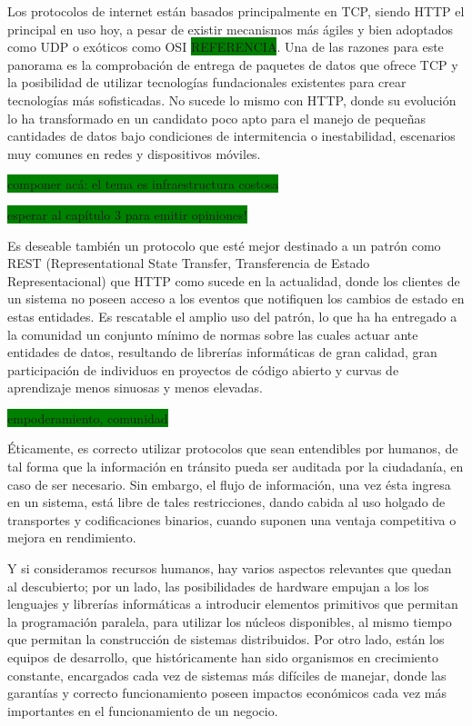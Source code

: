 Los protocolos de internet están basados principalmente en TCP, siendo HTTP el principal en uso hoy, a pesar de existir mecanismos más ágiles y bien adoptados como UDP o exóticos como OSI \colorbox{green}{REFERENCIA}. Una de las razones para este panorama es la comprobación de entrega de paquetes de datos que ofrece TCP y la posibilidad de utilizar tecnologías fundacionales existentes para crear tecnologías más sofisticadas. No sucede lo mismo con HTTP, donde su evolución lo ha transformado en un candidato poco apto para el manejo de pequeñas cantidades de datos bajo condiciones de intermitencia o inestabilidad, escenarios muy comunes en redes y dispositivos móviles.

\colorbox{green}{componer acá: el tema es infraestructura costosa}

\colorbox{green}{esperar al capítulo 3 para emitir opiniones!}

Es deseable también un protocolo que esté mejor destinado a un patrón como REST (Representational State Transfer, Transferencia de Estado Representacional) que HTTP como sucede en la actualidad, donde los clientes de un sistema no poseen acceso a los eventos que notifiquen los cambios de estado en estas entidades. Es rescatable el amplio uso del patrón, lo que ha ha entregado a la comunidad un conjunto mínimo de normas sobre las cuales actuar ante entidades de datos, resultando de librerías informáticas de gran calidad, gran participación de individuos en proyectos de código abierto y curvas de aprendizaje menos sinuosas y menos elevadas.

\colorbox{green}{empoderamiento, comunidad}

Éticamente, es correcto utilizar protocolos que sean entendibles por humanos, de tal forma que la información en tránsito pueda ser auditada por la ciudadanía, en caso de ser necesario. Sin embargo, el flujo de información, una vez ésta ingresa en un sistema, está libre de tales restricciones, dando cabida al uso holgado de transportes y codificaciones binarios, cuando suponen una ventaja competitiva o mejora en rendimiento.

Y si consideramos recursos humanos, hay varios aspectos relevantes que quedan al descubierto; por un lado, las posibilidades de hardware empujan a los los lenguajes y librerías informáticas a introducir elementos primitivos que permitan la programación paralela, para utilizar los núcleos disponibles, al mismo tiempo que permitan la construcción de sistemas distribuidos. Por otro lado, están los equipos de desarrollo, que históricamente han sido organismos en crecimiento constante, encargados cada vez de sistemas más difíciles de manejar, donde las garantías y correcto funcionamiento poseen impactos económicos cada vez más importantes en el funcionamiento de un negocio.

